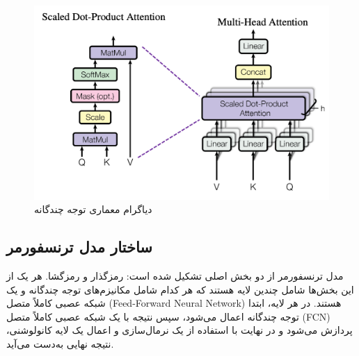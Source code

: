 \begin{figure}
	\centering
	\includegraphics[width=0.7\linewidth]{figs/mhattn1.png}
	\caption{دیاگرام معماری توجه چندگانه}
	\label{fig:mhattn1}
\end{figure}


\subsection*{ساختار مدل ترنسفورمر}
مدل ترنسفورمر از دو بخش اصلی تشکیل شده است: رمزگذار و رمزگشا. هر یک از این بخش‌ها شامل چندین لایه هستند که هر کدام شامل مکانیزم‌های توجه چندگانه و یک شبکه عصبی کاملاً متصل (Feed-Forward Neural Network) هستند. در هر لایه، ابتدا توجه چندگانه اعمال می‌شود، سپس نتیجه با یک شبکه عصبی کاملاً متصل (FCN) پردازش می‌شود و در نهایت با استفاده از یک نرمال‌سازی و اعمال یک لایه کانولوشنی، نتیجه نهایی به‌دست می‌آید.


%
%
%
%
%


